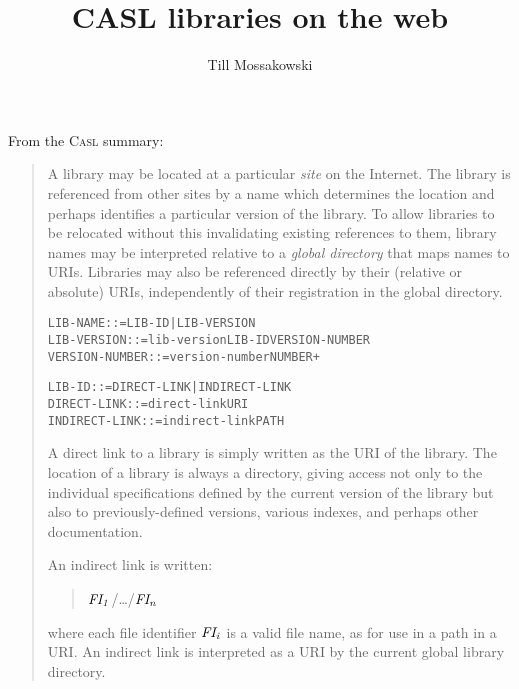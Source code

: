 \documentclass{article}
\renewcommand{\index}[1]{}
\newcommand{\QUERY}[1]
{\marginpar{\raggedright\hspace{0pt}\small #1\\~}}
\newenvironment{Grammar}
 {\small%
  \begin{alltt}}{\end{alltt}\ignorespacesafterend}
\newenvironment{AbstractGrammar}
 {\par\smallskip\samepage\begin{Grammar}}{\end{Grammar}\noindent
 \ignorespacesafterend}
\newenvironment{ConcreteDisplay}
 {\nopagebreak\begin{quote}\casl}{\end{quote}\noindent
 \ignorespacesafterend}
\newcommand{\Metasub}[2]{\mbox{$\it#1_{#2}$}}
\newcommand{\textbothindex}[2]{#1 #2\index{#1!#2}\index{#2!#1}}
\newcommand{\emphindex}[1]{\emph{#1}\index{#1}}
\newcommand{\gramindex}[1]{\texttt{#1}}
\newcommand{\CASL}{\textmd{\textsc{Casl}}\xspace }
\begin{document}
\title{CASL libraries on the web}
\author{Till Mossakowski}

\maketitle

From the \CASL summary:

\begin{quote}
A library may be located at a particular \emphindex{site} on the
Internet.  
The library is referenced from other sites by a name which determines
the location and perhaps identifies a particular version of the
library.  To allow libraries to be relocated without this invalidating
existing references to them, library names may be interpreted relative
to a \emph{\textbothindex{global}{directory}} that maps names to URIs.  
\QUERY{CASL/Summary 9, \ldots:\\
URL changed to URI.}
Libraries
may also be referenced directly by their (relative or absolute) URIs,
independently of their registration in the global directory.

\begin{AbstractGrammar}
\gramindex{LIB-NAME}       ::= LIB-ID | LIB-VERSION
\gramindex{LIB-VERSION}    ::= lib-version LIB-ID VERSION-NUMBER
\gramindex{VERSION-NUMBER} ::= version-number NUMBER+
\end{AbstractGrammar}

\begin{AbstractGrammar}
\gramindex{LIB-ID}        ::= DIRECT-LINK | INDIRECT-LINK
\gramindex{DIRECT-LINK}   ::= direct-link URI
\gramindex{INDIRECT-LINK} ::= indirect-link PATH
\end{AbstractGrammar}
A direct link to a library is simply written as the URI of the
library.  The location of a library is always a directory, giving
access not only to the individual specifications defined by the
current version of the library but also to previously-defined
versions, various indexes, and perhaps other documentation.

An indirect link is written:
\begin{ConcreteDisplay}
\Metasub{FI}{1}/\ldots/\Metasub{FI}{n}
\end{ConcreteDisplay}
where each file identifier \Metasub{FI}{i} is a valid file name, as
for use in a path in a URI.  An indirect link is interpreted as a URI
by the current global library directory.



\end{quote}
\end{document}
